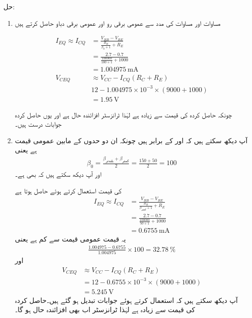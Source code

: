 حل:
\begin{enumerate}
\item
مساوات   اور مساوات   کی مدد سے عمومی برقی رو اور عمومی برقی دباو حاصل کرتے ہیں

\begin{align*}
I_{EQ} \approx I_{CQ} &= \frac{V_{BB}-V_{BE}}{\frac{R_B}{\beta_0+1}+R_E}\\
&=\frac{2.7-0.7}{\frac{100000}{100+1}+1000}\\
&=\SI{1.004975}{\milli \ampere}\\
V_{CEQ} &\approx V_{CC}-I_{CQ} \left(R_C+R_E \right )\\
&12-1.004975 \times 10^{-3} \times \left (9000+1000 \right )\\
&=\SI{1.95}{\volt}
\end{align*}
	
چونکہ حاصل کردہ   کی قیمت  سے زیادہ ہے لہٰذا ٹرانزسٹر 	افزائندہ حال ہے اور یوں حاصل کردہ  جوابات درست ہیں۔
\item
آپ دیکھ سکتے ہیں کہ  اور  کے برابر ہیں چونکہ ان دو حدوں کے مابین عمومی قیمت   ہے یعنی
\begin{align*}
\beta_0 =\frac{\beta_{\textrm{بلندتر}}+\beta_{\textrm{کمتر}}}{2} = \frac{150+50}{2}=100
\end{align*}
اور آپ دیکھ سکتے ہیں کہ  بھی ہے۔



	 کی قیمت استعمال کرتے ہوئے حاصل ہوتا ہے
\begin{align*}
I_{EQ} \approx I_{CQ} &=\frac{V_{BB}-V_{BE}}{\frac{R_B}{\beta_{\textrm{کمتر}}+1}+R_E}\\
&=\frac{2.7-0.7}{\frac{100000}{50+1}+1000}\\
&=\SI{0.6755}{\milli \ampere}
\end{align*}
یہ قیمت عمومی قیمت سے   کم ہے یعنی
\begin{align*}
\frac{1.004975-0.6755}{1.004975} \times 100 = \SI{32.78}{\percent}
\end{align*}
اور
\begin{align*}
V_{CEQ}  & \approx V_{CC}-I_{CQ} \left (R_C+R_E \right )\\
&=12-0.6755 \times 10^{-3} \times \left (9000+1000 \right )\\
&=\SI{5.245}{\volt}
\end{align*}
	آپ دیکھ سکتے ہیں کہ  استعمال کرتے ہوئے جوابات تبدیل ہو گئے ہیں۔حاصل کردہ   کی قیمت  سے زیادہ ہے لہٰذا ٹرانزسٹر اب بھی افزائندہ حال  ہو گا۔


\end{enumerate}

